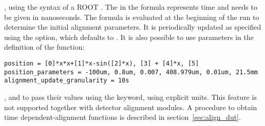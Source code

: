, using the syntax of a ROOT . The  in the formula represents time and needs to be given in nanoseconds. The formula is evaluated at the beginning of the run to determine the initial alignment parameters. It is periodically updated as specified using the  option, which defaults to . It is also possible to use parameters in the definition of the function:

\begin{verbatim}
position = [0]*x*x+[1]*x-sin([2]*x), [3] + [4]*x, [5]
position_parameters = -100um, 0.8um, 0.007, 408.979um, 0.01um, 21.5mm
alignment_update_granularity = 10s
\end{verbatim}

, and to pass their values using the  keyword, using explicit units. This feature is not supported together with detector alignment modules. A procedure to obtain time dependent-alignment functions is described in section~\ref{sec:align_dut}.
